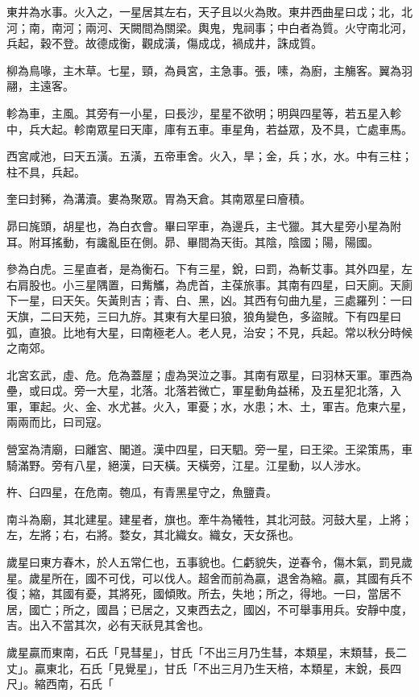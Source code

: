 \begin{pinyinscope}
東井為水事。火入之，一星居其左右，天子且以火為敗。東井西曲星曰戉；北，北河；南，南河；兩河、天闕間為關梁。輿鬼，鬼祠事；中白者為質。火守南北河，兵起，穀不登。故德成衡，觀成潢，傷成戉，禍成井，誅成質。

柳為鳥喙，主木草。七星，頸，為員宮，主急事。張，嗉，為廚，主觴客。翼為羽翮，主遠客。

軫為車，主風。其旁有一小星，曰長沙，星星不欲明；明與四星等，若五星入軫中，兵大起。軫南眾星曰天庫，庫有五車。車星角，若益眾，及不具，亡處車馬。

西宮咸池，曰天五潢。五潢，五帝車舍。火入，旱；金，兵；水，水。中有三柱；柱不具，兵起。

奎曰封豨，為溝瀆。婁為聚眾。胃為天倉。其南眾星曰廥積。

昴曰旄頭，胡星也，為白衣會。畢曰罕車，為邊兵，主弋獵。其大星旁小星為附耳。附耳搖動，有讒亂臣在側。昴、畢間為天街。其陰，陰國；陽，陽國。

參為白虎。三星直者，是為衡石。下有三星，銳，曰罰，為斬艾事。其外四星，左右肩股也。小三星隅置，曰觜觿，為虎首，主葆旅事。其南有四星，曰天廁。天廁下一星，曰天矢。矢黃則吉；青、白、黑，凶。其西有句曲九星，三處羅列：一曰天旗，二曰天苑，三曰九斿。其東有大星曰狼，狼角變色，多盜賊。下有四星曰弧，直狼。比地有大星，曰南極老人。老人見，治安；不見，兵起。常以秋分時候之南郊。

北宮玄武，虛、危。危為蓋屋；虛為哭泣之事。其南有眾星，曰羽林天軍。軍西為壘，或曰戉。旁一大星，北落。北落若微亡，軍星動角益稀，及五星犯北落，入軍，軍起。火、金、水尤甚。火入，軍憂；水，水患；木、土，軍吉。危東六星，兩兩而比，曰司寇。

營室為清廟，曰離宮、閣道。漢中四星，曰天駟。旁一星，曰王梁。王梁策馬，車騎滿野。旁有八星，絕漢，曰天橫。天橫旁，江星。江星動，以人涉水。

杵、臼四星，在危南。匏瓜，有青黑星守之，魚鹽貴。

南斗為廟，其北建星。建星者，旗也。牽牛為犧牲，其北河鼓。河鼓大星，上將；左，左將；右，右將。婺女，其北織女。織女，天女孫也。

歲星曰東方春木，於人五常仁也，五事貌也。仁虧貌失，逆春令，傷木氣，罰見歲星。歲星所在，國不可伐，可以伐人。超舍而前為贏，退舍為縮。贏，其國有兵不復；縮，其國有憂，其將死，國傾敗。所去，失地；所之，得地。一曰，當居不居，國亡；所之，國昌；已居之，又東西去之，國凶，不可舉事用兵。安靜中度，吉。出入不當其次，必有天祅見其舍也。

歲星贏而東南，石氏「見彗星」，甘氏「不出三月乃生彗，本類星，末類彗，長二丈」。贏東北，石氏「見覺星」，甘氏「不出三月乃生天棓，本類星，末銳，長四尺」。縮西南，石氏「


\end{pinyinscope}

